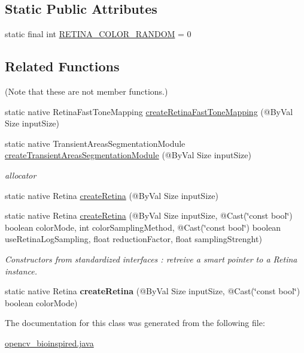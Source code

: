 \subsection*{Static Public Attributes}
\begin{DoxyCompactItemize}
\item 
static final int \hyperlink{group__bioinspired_ga05a86ff7b93be7a4fe366bddc1b71e83}{R\+E\+T\+I\+N\+A\+\_\+\+C\+O\+L\+O\+R\+\_\+\+R\+A\+N\+D\+OM} = 0
\end{DoxyCompactItemize}
\subsection*{Related Functions}
(Note that these are not member functions.) \begin{DoxyCompactItemize}
\item 
static native Retina\+Fast\+Tone\+Mapping \hyperlink{group__bioinspired_ga8193701044bddfabf0e07b3e3a3a7f4c}{create\+Retina\+Fast\+Tone\+Mapping} (@By\+Val Size input\+Size)
\item 
static native Transient\+Areas\+Segmentation\+Module \hyperlink{group__bioinspired_gac278083089d25770df4077c91d0846a0}{create\+Transient\+Areas\+Segmentation\+Module} (@By\+Val Size input\+Size)
\begin{DoxyCompactList}\small\item\em allocator \end{DoxyCompactList}\end{DoxyCompactItemize}
\textbf{ }\par
\begin{DoxyCompactItemize}
\item 
static native Retina \hyperlink{group__bioinspired_gad50e4058a5005de5c1c5bdb255b02702}{create\+Retina} (@By\+Val Size input\+Size)
\item 
static native Retina \hyperlink{group__bioinspired_ga050dd55b35ef6df434cb1ce7a98b7954}{create\+Retina} (@By\+Val Size input\+Size, @Cast(\char`\"{}const bool\char`\"{}) boolean color\+Mode, int color\+Sampling\+Method, @Cast(\char`\"{}const bool\char`\"{}) boolean use\+Retina\+Log\+Sampling, float reduction\+Factor, float sampling\+Strenght)
\begin{DoxyCompactList}\small\item\em Constructors from standardized interfaces \+: retreive a smart pointer to a Retina instance. \end{DoxyCompactList}\item 
static native Retina {\bfseries create\+Retina} (@By\+Val Size input\+Size, @Cast(\char`\"{}const bool\char`\"{}) boolean color\+Mode)
\end{DoxyCompactItemize}



The documentation for this class was generated from the following file\+:\begin{DoxyCompactItemize}
\item 
\hyperlink{opencv__bioinspired_8java}{opencv\+\_\+bioinspired.\+java}\end{DoxyCompactItemize}
